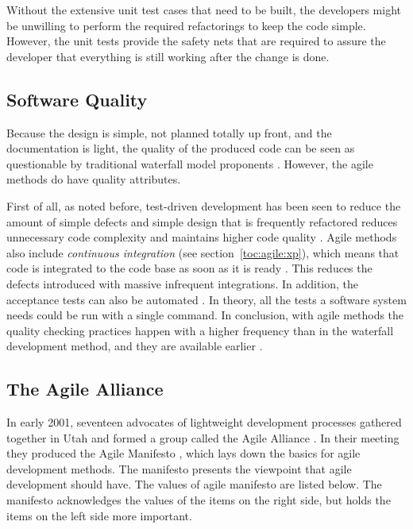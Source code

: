 Without the extensive unit test cases that need to be built, the 
developers might be unwilling to perform the required refactorings to 
keep the code simple. However, the unit tests provide the safety nets 
that are required to assure the developer that everything is still 
working after the change is done. \citep{questioningxp}


\subsection{Software Quality}
\label{toc:agile:overview:quality}

Because the design is simple, not planned totally up front, and the 
documentation is light, the quality of the produced code can be seen 
as questionable by traditional waterfall model proponents 
\citep{agilequality}. However, the agile methods do have quality
attributes.

First of all, as noted before, test-driven development has been seen 
to reduce the amount of simple defects \citep{agileadoption} and 
simple design that is frequently refactored reduces unnecessary code 
complexity and maintains higher code quality \citep{betterway}. Agile 
methods also include \textsl{continuous integration} (see 
section~\ref{toc:agile:xp}), which means that code is integrated to 
the code base as soon as it is ready \citep{agilesdm}. This reduces 
the defects introduced with massive infrequent integrations. In 
addition, the acceptance tests can also be automated 
\citep{xpapplied}. In theory, all the tests a software system needs 
could be run with a single command. In conclusion, with agile methods 
the quality checking practices happen with a higher frequency than in 
the waterfall development method, and they are available earlier 
\citep{agilequality}.


\subsection{The Agile Alliance}
\label{toc:agile:overview:agilealliance}

In early 2001, seventeen advocates of lightweight development 
processes gathered together in Utah and formed a group called the 
Agile Alliance \citep{agilealliance,agilesd}. In their meeting they 
produced the Agile Manifesto \citep{manifesto}, which lays down the 
basics for agile development methods. The manifesto presents the 
viewpoint that agile development should have. The values of agile 
manifesto are listed below. The manifesto acknowledges the values of 
the items on the right side, but holds the items on the left side more 
important.

